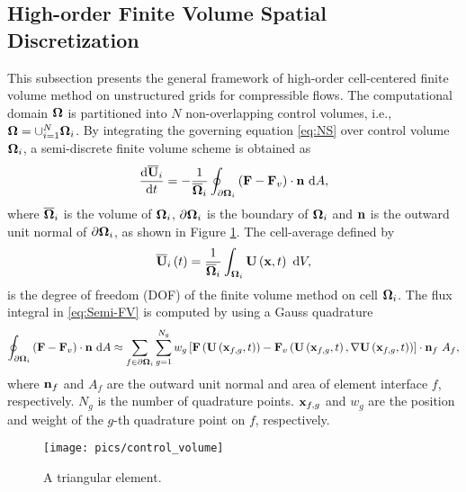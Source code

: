 \subsection{High-order Finite Volume Spatial Discretization}
\label{ssec:FV}

This subsection presents the general framework of high-order cell-centered finite volume method on unstructured grids for compressible flows.
The computational domain $\mathbf{\Omega}$ is partitioned into $N$ non-overlapping control volumes, i.e., $\mathbf{\Omega}= \cup^N_{i=1}{\mathbf{\Omega}_i}$. By integrating the governing equation \eqref{eq:NS} over control volume $\mathbf{\Omega}_i$, a semi-discrete finite volume scheme is obtained as
\begin{equation}
	\label{eq:Semi-FV}
	\dfrac{ \dd\overline{\mathbf{U}}_i }{\dd t} = -\dfrac{1}{\overline{\mathbf{\Omega}}_i} \oint_{\partial \mathbf{\Omega}_i} \left(\mathbf{F} - \mathbf{F}_v \right) \cdot \mathbf{n} \ \dd A,
\end{equation}
where $\overline{\mathbf{\Omega}}_i$ is the volume of $\mathbf{\Omega}_i$, $\partial \mathbf{\Omega}_i$ is the boundary of $\mathbf{\Omega}_i$ and $\mathbf{n}$ is the outward unit normal of $\partial \mathbf{\Omega}_i$, as shown in Figure \ref{fig:controlvolume}. The cell-average defined by
\begin{equation}
    \label{eq:FVMean}
    \overline{\mathbf{U}}_i \left(t\right)= \frac{1}{\overline{\mathbf{\Omega}}_i}\int_{\mathbf{\Omega}_i}\mathbf{U} \left(\mathbf{x},t\right)\ \dd V,
\end{equation}
is the degree of freedom (DOF) of the finite volume method on cell $\mathbf{\Omega}_i$.
The flux integral in \eqref{eq:Semi-FV} is computed by using a Gauss quadrature 
\begin{equation}
	\label{eq:Flux-Integral}
	\oint_{\partial \mathbf{\Omega}_i} \left(\mathbf{F} - \mathbf{F}_v \right) \cdot \mathbf{n} \ \dd A \approx \sum_{f \in \partial \mathbf{\Omega}_i} \sum_{g=1}^{N_g} w_g \left[\mathbf{F} \left(\mathbf{U} \left(\mathbf{x}_{f,g},t\right)\right) - \mathbf{F}_v \left(\mathbf{U}\left(\mathbf{x}_{f,g},t\right), \nabla \mathbf{U} \left(\mathbf{x}_{f,g},t\right)\right)\right] \cdot \mathbf{n}_f \ A_f,
\end{equation}
where $\mathbf{n}_f$ and $A_f$ are the outward unit normal and area of element interface $f$, respectively. $N_g$ is the number of quadrature points. $\mathbf{x}_{f,g}$ and $w_g$ are the position and weight of the $g$-th quadrature point on $f$, respectively. 

\begin{figure}[htbp!]
	\centering
	\texttt{[image: pics/control\_volume]}
	\caption{A triangular element.}
	\label{fig:controlvolume}
\end{figure}


